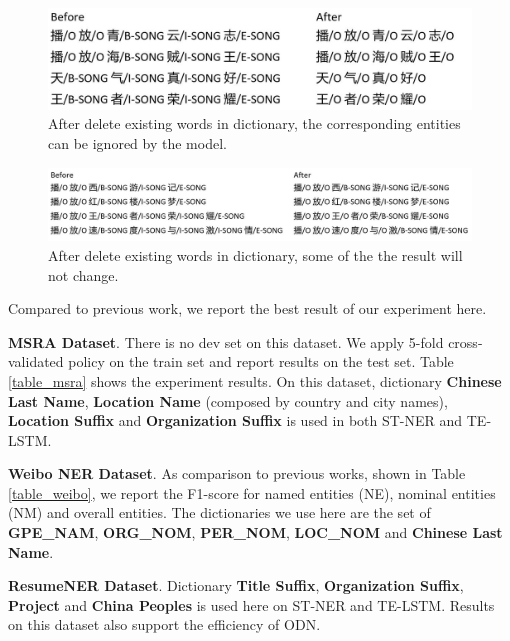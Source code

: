 \documentclass[letterpaper]{article} %
\begin{document}
\begin{figure}[t]
\centering
\includegraphics[width=0.8\columnwidth]{change_after_delete_song} %
\caption{After delete existing words in dictionary, the corresponding entities can be ignored by the model.}
\label{fig4}
\end{figure}

\begin{figure}[t]
\centering
\includegraphics[width=1.0\columnwidth]{no_change_after_delete_song} %
\caption{After delete existing words in dictionary, some of the the result will not change.}
\label{fig5}
\end{figure}

Compared to previous work, we report the best result of our experiment here.

\textbf{MSRA Dataset}. There is no dev set on this dataset. We apply 5-fold cross-validated policy on the train set and report results on the test set. Table \ref{table_msra} shows the experiment results. On this dataset, dictionary \textbf{Chinese Last Name}, \textbf{Location Name} (composed by country and city names), \textbf{Location Suffix} and \textbf{Organization Suffix} is used in both ST-NER and TE-LSTM. 

\textbf{Weibo NER Dataset}. As comparison to previous works, shown in Table \ref{table_weibo}, we report the F1-score for named entities (NE), nominal  entities (NM) and overall entities. The dictionaries we use here are the set of \textbf{GPE\_NAM}, \textbf{ORG\_NOM}, \textbf{PER\_NOM}, \textbf{LOC\_NOM} and \textbf{Chinese Last Name}. 

\textbf{ResumeNER Dataset}. Dictionary \textbf{Title Suffix}, \textbf{Organization Suffix}, \textbf{Project} and \textbf{China Peoples} is used here on ST-NER and TE-LSTM. Results on this dataset also support the efficiency of ODN.
\end{document}
